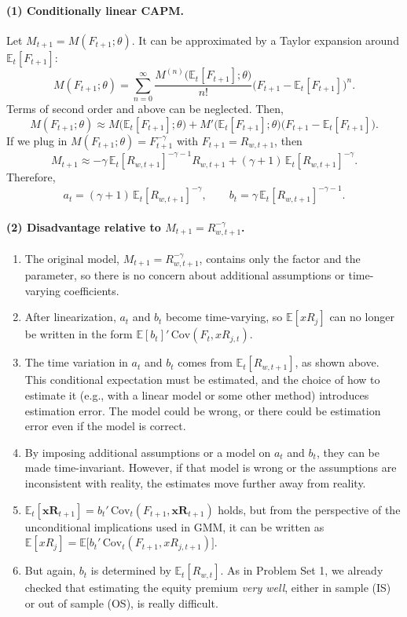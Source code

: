 \documentclass[11pt]{article}
\begin{document}
\paragraph{(1) Conditionally linear CAPM.}
Let $M_{t+1} = M(F_{t+1}; \theta)$. It can be approximated by a Taylor expansion around
$\mathbb{E}_t[F_{t+1}]$:
\[
  M(F_{t+1}; \theta)
  = \sum_{n=0}^{\infty} \frac{M^{(n)}\big(\mathbb{E}_t[F_{t+1}]; \theta\big)}{n!}
    \big(F_{t+1} - \mathbb{E}_t[F_{t+1}]\big)^n .
\]
Terms of second order and above can be neglected. Then,
\[
  M(F_{t+1}; \theta)
  \approx M\big(\mathbb{E}_t[F_{t+1}]; \theta\big)
  + M'\big(\mathbb{E}_t[F_{t+1}]; \theta\big)\big(F_{t+1} - \mathbb{E}_t[F_{t+1}]\big).
\]
If we plug in $M(F_{t+1}; \theta) = F_{t+1}^{-\gamma}$ with $F_{t+1} = R_{w,t+1}$, then
\[
  M_{t+1} \approx -\gamma\, \mathbb{E}_t[R_{w,t+1}]^{-\gamma-1} R_{w,t+1}
  + (\gamma + 1)\, \mathbb{E}_t[R_{w,t+1}]^{-\gamma}.
\]
Therefore,
\[
  a_t = (\gamma + 1)\, \mathbb{E}_t[R_{w,t+1}]^{-\gamma},
  \qquad
  b_t = \gamma\, \mathbb{E}_t[R_{w,t+1}]^{-\gamma-1}.
\]

\paragraph{(2) Disadvantage relative to $M_{t+1} = R_{w,t+1}^{-\gamma}$.}
\begin{enumerate}
  \item The original model, $M_{t+1} = R_{w,t+1}^{-\gamma}$, contains only the factor and the
    parameter, so there is no concern about additional assumptions or time-varying coefficients.
  \item After linearization, $a_t$ and $b_t$ become time-varying, so $\mathbb{E}[xR_j]$ can no
    longer be written in the form $\mathbb{E}[b_t]'\,\mathrm{Cov}(F_t, xR_{j,t})$.
  \item The time variation in $a_t$ and $b_t$ comes from $\mathbb{E}_t[R_{w,t+1}]$, as shown above.
    This conditional expectation must be estimated, and the choice of how to estimate it (e.g.,
    with a linear model or some other method) introduces estimation error. The model could be
    wrong, or there could be estimation error even if the model is correct.
  \item By imposing additional assumptions or a model on $a_t$ and $b_t$, they can be made
    time-invariant. However, if that model is wrong or the assumptions are inconsistent with
    reality, the estimates move further away from reality.
  \item $\mathbb{E}_t[\mathbf{xR}_{t+1}] = b_t'\,\mathrm{Cov}_t(F_{t+1}, \mathbf{xR}_{t+1})$ holds, but from the
    perspective of the unconditional implications used in GMM, it can be written as
    $\mathbb{E}[xR_j] = \mathbb{E}\big[b_t'\,\mathrm{Cov}_t(F_{t+1}, xR_{j,t+1})\big]$.
  \item But again, $b_t$ is determined by $\mathbb{E}_t[R_{w,t}]$. As in Problem Set 1, we already
    checked that estimating the equity premium \emph{very well}, either in sample (IS) or out of
    sample (OS), is really difficult.
\end{enumerate}
\end{document}
